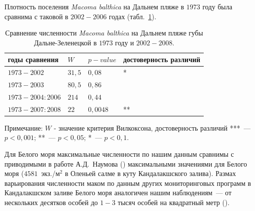 Плотность поселения {\it Macoma balthica} на Дальнем пляже в $1973$ году была сравнима с таковой в $2002-2006$ годах (табл.~\ref{tab:DZ_N_1973_sravnenie}).
	\begin{table}[p]
	\caption{Сравнение численности {\it Macoma balthica} на Дальнем пляже губы Дальне-Зеленецкой в $1973$ году и $2002-2008$.}
	\label{tab:DZ_N_1973_sravnenie}
	\begin{tabularx}{\textwidth}{|*{4}{X|}} \hline
	годы сравнения & $W$ & $p-value$ & достоверность различий \\ 
	\hline
	$1973 - 2002$ & $31,5$ & $0,08$ & *\\
	\hline
	$1973 - 2003$ & $80,5$ & $0,86$ & \\
	\hline
	$1973 - 2004:2006$ &  $214$ & $0,44$ & \\
	\hline
	$1973 - 2007:2008$ & $22$ & $0,0048$ & ** \\
	\hline
	\end{tabularx}
	{\footnotesize Примечание: $W$ - значение критерия Вилкоксона, достоверность различий ***~--- $p<0,001$; **~--- $p<0,05$; *~--- $p<0,1$.}
	\end{table}


Для Белого моря максимальные численности по нашим данным сравнимы с приводимыми в работе А.Д.~Наумова (\cite{Naumov_2006}) максимальными значениями для Белого моря ($4581$~экз./м$^2$ в Оленьей салме в куту Кандалакшского залива). 
Размах варьирования численности маком по данным других мониторинговых программ в Кандалакшском заливе Белого моря аналогичен нашим наблюдениям~--- от нескольких десятков особей до $1-3$ тысяч особей на квадратный метр (\cite{Semenova_1974, Maximovich_et_al_1991, Varfolomeeva_Naumov_2013}). 



